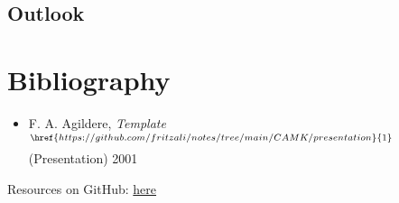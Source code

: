 	\subsection{Outlook}

	\section{Bibliography}

	\begin{frame}
		\begin{center}\textcolor{MASS}{}\end{center}\vspace{2ex}
		\begin{itemize}
			\item F. A. Agildere, {\itshape{Template}}$^{\href{https://github.com/fritzali/notes/tree/main/CAMK/presentation}{1}}$
				  (Presentation) 2001
		\end{itemize}
		\vspace{2ex}
		Resources on GitHub: \href{https://github.com/fritzali/notes/tree/main/CAMK/presentation/template}{here}
	\end{frame}

